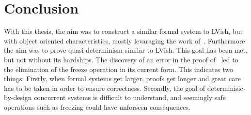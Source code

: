 \section{Conclusion}%
\label{sec:conclusion}

With this thesis, the aim was to construct a similar formal system to LVish, but
with object oriented characteristics, mostly levaraging the work
of~\textcite{conf/oopsla/HallerL16}. Furthermore the aim was to prove
quasi-determinism similar to LVish. This goal has been met, but not without its
hardships. The discovery of an error in the proof
of~\textcite{kuper2014freezeTR} led to the elimination of the freeze operation
in its current form. This indicates two things: Firstly, when formal systems get
larger, proofs get longer and great care has to be taken in order to ensure
correctness. Secondly, the goal of determinisic-by-design concurrent systems is
difficult to understand, and seemingly safe operations such as freezing could
have unforseen consequences.





